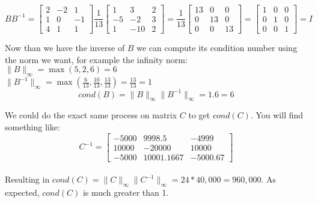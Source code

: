 \documentclass[12pt]{article}
\begin{document}
$$
BB^{-1} = \begin{bmatrix}
  2 & -2 & 1 \\
  1 & 0 & -1 \\
  4 & 1 & 1
\end{bmatrix}
\frac{1}{13} \begin{bmatrix}
  1 & 3 & 2 \\
  -5 & -2 & 3 \\
  1 & -10 & 2
\end{bmatrix}
= \frac{1}{13} \begin{bmatrix}
  13 & 0 & 0 \\
  0 & 13 & 0 \\
  0 & 0 & 13
\end{bmatrix}
= \begin{bmatrix}
  1 & 0 & 0 \\
  0 & 1 & 0 \\
  0 & 0 & 1
\end{bmatrix} = I
$$

Now than we have the inverse of $B$ we can compute its condition number using the norm we want, for example the infinity norm: \\
$ \| B \|_\infty = \max (5, 2, 6) = 6 $ \\
$ \| B^{-1} \|_\infty = \max (\frac{6}{13}, \frac{10}{13}, \frac{13}{13}) = \frac{13}{13} = 1 $ \\
$$ cond(B) = \| B \|_\infty  \| B^{-1} \|_\infty = 1.6 = 6 $$

We could do the exact same process on matrix $C$ to get $cond(C)$. You will find something like: \\
$$
C^{-1} = \begin{bmatrix}
  -5000 & 9998.5 & -4999 \\
  10000 & -20000 & 10000 \\
  -5000 & 10001.1667 & -5000.67
\end{bmatrix}
$$ \\

Resulting in $cond(C) = \| C \|_\infty  \| C^{-1} \|_\infty = 24 * 40,000 = 960,000$. As expected, $cond(C)$ is much greater than 1.
\end{document}
